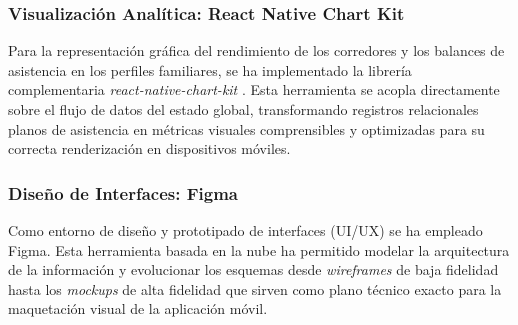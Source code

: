 \subsubsection{Visualización Analítica: React Native Chart Kit}
Para la representación gráfica del rendimiento de los corredores y los balances de asistencia en los perfiles familiares, se ha implementado la librería complementaria \textit{react-native-chart-kit} \cite{ReactNativeChartKit}. Esta herramienta se acopla directamente sobre el flujo de datos del estado global, transformando registros relacionales planos de asistencia en métricas visuales comprensibles y optimizadas para su correcta renderización en dispositivos móviles.

\subsubsection{Diseño de Interfaces: Figma}
Como entorno de diseño y prototipado de interfaces (UI/UX) se ha empleado Figma. Esta herramienta basada en la nube ha permitido modelar la arquitectura de la información y evolucionar los esquemas desde \textit{wireframes} de baja fidelidad hasta los \textit{mockups} de alta fidelidad que sirven como plano técnico exacto para la maquetación visual de la aplicación móvil.
